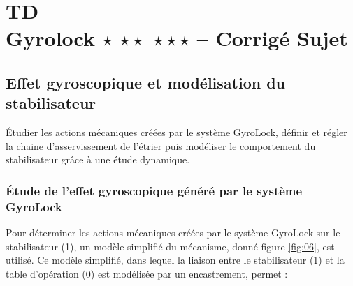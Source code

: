 \chapter*{TD  \\ 
Gyrolock  \ifnormal $\star$ \else \fi \ifdifficile $\star\star$ \else \fi \iftdifficile $\star\star\star$ \else \fi
-- \ifprof Corrigé \else Sujet \fi}

\iflivret {} \else
\ifprof  {} \else \fi
\fi

\setcounter{question}{0}

\ifprof  {}\else \fi

\section*{Effet gyroscopique et modélisation du stabilisateur}
\begin{obj}
Étudier les actions mécaniques créées par le système GyroLock, définir et régler la chaine d'asservissement de l'étrier puis modéliser le comportement du stabilisateur grâce à une étude dynamique.
\end{obj}

\subsection*{\label{sec:IIA} Étude de l'effet gyroscopique généré par le système GyroLock}

\ifprof
\else
Pour déterminer les actions mécaniques créées par le système GyroLock sur le stabilisateur (1), un modèle simplifié du mécanisme, donné figure \ref{fig:06}, est utilisé. Ce modèle simplifié, dans lequel la liaison entre le stabilisateur (1) et la table d'opération (0) est modélisée par un encastrement, permet :

